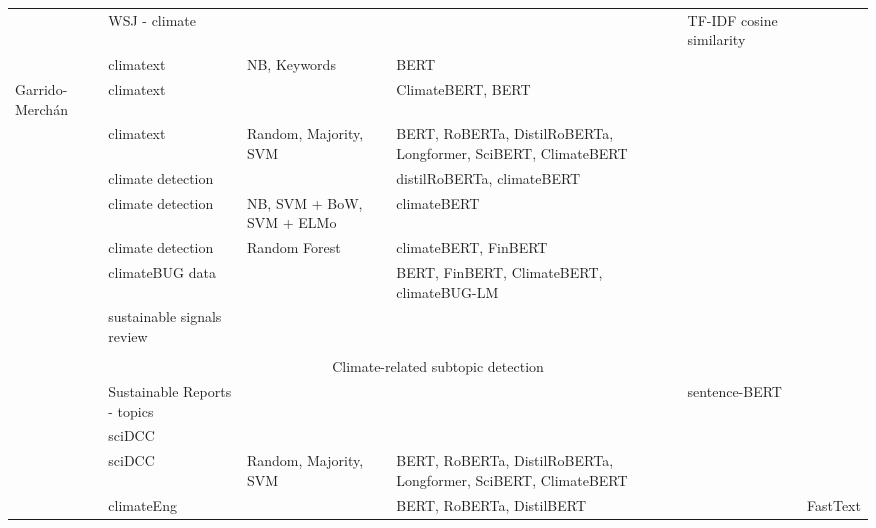 \begin{longtable}[c]{lp{3cm}p{1.5cm}p{3cm}p{1.5cm}p{3cm}}
    \citet{Engle_hedging_climatechange} & \raggedright WSJ - climate &  &   & \raggedright TF-IDF cosine similarity &  \\

    \citet{varini_climatext_2020} & \raggedright climatext &  \raggedright NB, Keywords & BERT &  &  \\

    Garrido-Merchán \cite{garridomerchán2023finetuning} & \raggedright climatext &   & ClimateBERT, BERT &  &  \\

    \citet{spokoyny2023answering} &  climatext & Random, Majority, SVM & BERT, RoBERTa, DistilRoBERTa, Longformer, SciBERT, ClimateBERT &  &  \\

    \citet{nicolas_webersinke_climatebert_2021} & \raggedright climate detection   &  & distilRoBERTa, climateBERT &  &  \\

    \citet{bingler2023cheaptalkspecificitysentiment} & \raggedright climate detection   & \raggedright NB, SVM + BoW, SVM + ELMo & climateBERT &  &  \\

    \citet{bjarne_brie_mandatory_2022} & \raggedright climate detection   & Random Forest & climateBERT, FinBERT &  &  \\

    \citet{yu_climatebug_2024} & \raggedright climateBUG data &   & BERT, FinBERT, ClimateBERT, climateBUG-LM &  &  \\

    \citet{linSUSTAINABLESIGNALSijcai2023} &  sustainable signals review &   &  &  &  \\
&&&&&\\
    \multicolumn{6}{c}{Climate-related subtopic detection} \\
    \midrule
    \citet{hyewon_kang_analyzing_2022} & \raggedright Sustainable Reports - topics &   &  & sentence-BERT &  \\

    \citet{mishra2021neuralnere} & \raggedright sciDCC &   &  &  &  \\

    \citet{spokoyny2023answering} & \raggedright sciDCC & Random, Majority, SVM & BERT, RoBERTa, DistilRoBERTa, Longformer, SciBERT, ClimateBERT &  &  \\

    \citet{vaid-etal-2022-towards} & \raggedright climateEng &   & BERT, RoBERTa, DistilBERT &  & FastText  \\


\end{longtable}
